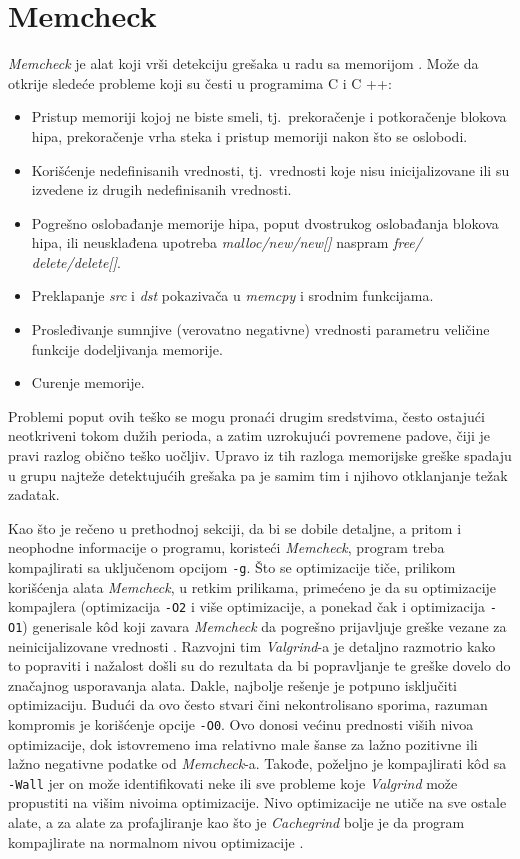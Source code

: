 \documentclass[12pt,oneside]{memoir}
\theoremstyle{plain}
\theoremstyle{definition}
\begin{document}
\section{Memcheck}
\textit{Memcheck} je alat koji vrši detekciju grešaka u radu sa memorijom \cite{Memcheck}. Može da otkrije sledeće probleme koji su česti u programima C i C ++:
\begin{itemize}
\item Pristup memoriji kojoj ne biste smeli, tj.~prekoračenje i potkoračenje blokova hipa, prekoračenje vrha steka i pristup memoriji nakon što se oslobodi.
\item Korišćenje nedefinisanih vrednosti, tj.~vrednosti koje nisu inicijalizovane ili su izvedene iz drugih nedefinisanih vrednosti.
\item Pogrešno oslobađanje memorije hipa, poput dvostrukog oslobađanja blokova hipa, ili neusklađena upotreba \textit{malloc/new/new[]} naspram \textit{free/ delete/delete[]}.
\item Preklapanje \textit{src} i \textit{dst} pokazivača u \textit{memcpy} i srodnim funkcijama.
\item Prosleđivanje sumnjive (verovatno negativne) vrednosti parametru veličine funkcije dodeljivanja memorije.
\item Curenje memorije.
\end{itemize}

Problemi poput ovih teško se mogu pronaći drugim sredstvima, često ostajući neotkriveni tokom dužih perioda, a zatim uzrokujući povremene padove, čiji je pravi razlog obično teško uočljiv. Upravo iz tih razloga memorijske greške spadaju u grupu najteže detektujućih grešaka pa je samim tim i njihovo otklanjanje težak zadatak.

Kao što je rečeno u prethodnoj sekciji, da bi se dobile detaljne, a pritom i neophodne informacije o programu, koristeći \textit{Memcheck}, program treba kompajlirati sa uključenom opcijom \texttt{-g}. Što se optimizacije tiče, prilikom korišćenja alata \textit{Memcheck}, u retkim prilikama, primećeno je da su optimizacije kompajlera (optimizacija \texttt{-O2} i više optimizacije, a ponekad čak i optimizacija \texttt{-O1}) generisale k\^od koji zavara \textit{Memcheck} da pogrešno prijavljuje greške vezane za neinicijalizovane vrednosti \cite{ValgrindCore}. Razvojni tim \textit{Valgrind}-a je detaljno razmotrio kako to popraviti i nažalost došli su do rezultata da bi popravljanje te greške dovelo do značajnog usporavanja alata. Dakle, najbolje rešenje je potpuno isključiti optimizaciju. Budući da ovo često stvari čini nekontrolisano sporima, razuman kompromis je korišćenje opcije \texttt{-O0}. Ovo donosi većinu prednosti viših nivoa optimizacije, dok istovremeno ima relativno male šanse za lažno pozitivne ili lažno negativne podatke od \textit{Memcheck}-a. Takođe, poželjno je kompajlirati k\^od sa \texttt{-Wall} jer on može identifikovati neke ili sve probleme koje \textit{Valgrind} može propustiti na višim nivoima optimizacije. Nivo optimizacije ne utiče na sve ostale alate, a za alate za profajliranje kao što je \textit{Cachegrind} bolje je da program kompajlirate na normalnom nivou optimizacije \cite{ValgrindCore}. 
\end{document}

